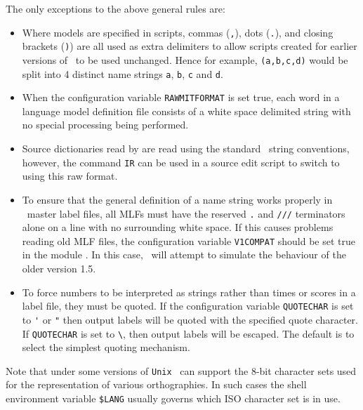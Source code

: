 The only exceptions to the above general rules are:
\begin{itemize}

\item  Where models are specified in  scripts,
commas (\verb+,+), 
dots (\verb+.+),
and closing brackets (\verb+)+) 
are all used as extra delimiters to allow   scripts
created for earlier versions of \HTK\ to be used unchanged.
Hence for example, \texttt{(a,b,c,d)} would be split into 4 
distinct name strings \texttt{a}, \texttt{b}, \texttt{c} and \texttt{d}.

\item When the configuration variable
\texttt{RAWMITFORMAT} is set true,  each word in a language model
definition file consists of a white space delimited string with no 
special processing being performed.

\item  Source dictionaries read by  are read using
the standard \HTK\ string conventions, however, the command \texttt{IR}
can be used in a  source edit script to switch to using
this raw format.

\item 
To ensure that the general definition of a name string works
properly in \HTK\ master label files, all
MLFs must have the reserved \texttt{.} and \verb+///+ terminators 
alone on a line with no surrounding white space. 
If this causes problems reading old MLF files, the configuration
variable \texttt{V1COMPAT} should be set true in the module .  
In this case,
\HTK\ will attempt to simulate the behaviour of the older version 1.5.

\item
To force numbers to be interpreted as strings rather than times or scores in a
label file, they must be quoted.  If the configuration variable
\texttt{QUOTECHAR} is set to \verb+'+ or \verb+"+ then output labels will be
quoted with the specified quote character.  If \texttt{QUOTECHAR} is set to  
\verb+\+, then output labels will be escaped. The default is to select the 
simplest quoting mechanism.
\end{itemize}

Note that under some versions of \texttt{Unix} \HTK\ can support the 8-bit
character sets used for the representation of various orthographies. In
such cases the shell environment variable \texttt{\$LANG} usually governs
which ISO character set is in use.

